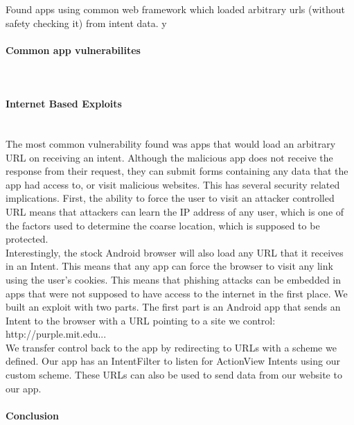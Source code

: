 \documentclass[12pt,a4paper]{article} \usepackage{verbatim}
\begin{document}
Found apps using common web framework which loaded arbitrary urls (without
safety checking it) from intent data.  y

\paragraph{Common app vulnerabilites} ~\\


\paragraph{Internet Based Exploits} ~\\ The most common vulnerability found was
apps that would load an arbitrary URL on receiving an intent. Although the
malicious app does not receive the response from their request, they can submit
forms containing any data that the app had access to, or visit malicious
websites. This has several security related implications. First, the ability to
force the user to visit an attacker controlled URL means that attackers can
learn the IP address of any user, which is one of the factors used to determine
the coarse location, which is supposed to be protected.  \\ Interestingly, the
stock Android browser will also load any URL that it receives in an Intent. This
means that any app can force the browser to visit any link using the user's
cookies. This means that phishing attacks can be embedded in apps that were not
supposed to have access to the internet in the first place.  We built an exploit
with two parts. The first part is an Android app that sends an Intent to the
browser with a URL pointing to a site we control: http://purple.mit.edu... \\ We
transfer control back to the app by redirecting to URLs with a scheme we
defined. Our app has an IntentFilter to listen for ActionView Intents using our
custom scheme. These URLs can also be used to send data from our website to our
app.

\paragraph{Conclusion} ~\\

 
\end{document}
